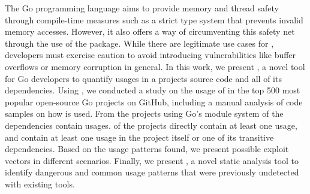 The Go programming language aims to provide memory and thread safety through compile-time measures such as a strict type system that prevents invalid memory accesses. 
However, it also offers a way of circumventing this safety net through the use of the \unsafe{} package.
While there are legitimate use cases for \unsafe{}, developers must exercise caution to avoid introducing vulnerabilities like buffer overflows or memory corruption in general.
In this work, we present \toolUsage{}, a novel tool for Go developers to quantify \unsafe{} usages in a projects source code and all of its dependencies.
Using \toolUsage{}, we conducted a study on the usage of \unsafe{} in the top 500 most popular open-source Go projects on GitHub, including a manual analysis of \numberCodeSnippets{} code samples on how \unsafe{} is used.
From the projects using Go's module system  \percentagePackagesWithUnsafe{} of the dependencies contain \unsafe{} usages. 
\percentageProjectsWithUnsafe{} of the projects directly contain at least one usage,
and \percentageProjectsAndDependenciesUnsafe{} contain at least one \unsafe{} usage in the project itself or one of its transitive dependencies.
Based on the usage patterns found, we present possible exploit vectors in different scenarios. 
Finally, we present \toolSA{}, a novel static analysis tool to identify dangerous and common usage patterns that were previously undetected with existing tools.
